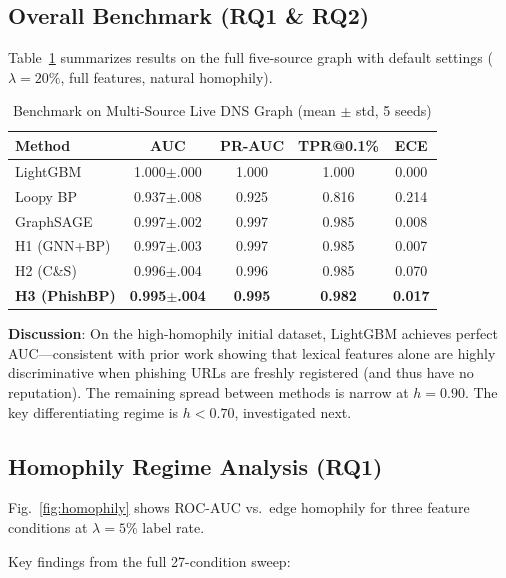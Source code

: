 \documentclass[conference]{IEEEtran}
\begin{document}
\subsection{Overall Benchmark (RQ1 \& RQ2)}

Table~\ref{tab:results} summarizes results on the full five-source graph with
default settings ($\lambda = 20\%$, full features, natural homophily).

\begin{table}[htbp]
\caption{Benchmark on Multi-Source Live DNS Graph (mean $\pm$ std, 5 seeds)}
\label{tab:results}
\begin{center}
\begin{tabular}{lcccc}
\toprule
\textbf{Method} & \textbf{AUC} & \textbf{PR-AUC} & \textbf{TPR@0.1\%} & \textbf{ECE} \\
\midrule
LightGBM        & 1.000$\pm$.000 & 1.000 & 1.000 & 0.000 \\
Loopy BP        & 0.937$\pm$.008 & 0.925 & 0.816 & 0.214 \\
GraphSAGE       & 0.997$\pm$.002 & 0.997 & 0.985 & 0.008 \\
H1 (GNN+BP)     & 0.997$\pm$.003 & 0.997 & 0.985 & 0.007 \\
H2 (C\&S)       & 0.996$\pm$.004 & 0.996 & 0.985 & 0.070 \\
\textbf{H3 (PhishBP)} & \textbf{0.995$\pm$.004} & \textbf{0.995} & \textbf{0.982} & \textbf{0.017} \\
\bottomrule
\end{tabular}
\end{center}
\end{table}

\textbf{Discussion}: On the high-homophily initial dataset, LightGBM achieves
perfect AUC---consistent with prior work showing that lexical features alone
are highly discriminative when phishing URLs are freshly registered (and thus
have no reputation). The remaining spread between methods is narrow at $h =
0.90$. The key differentiating regime is $h < 0.70$, investigated next.

\subsection{Homophily Regime Analysis (RQ1)}

Fig.~\ref{fig:homophily} shows ROC-AUC vs.\ edge homophily for three feature
conditions at $\lambda = 5\%$ label rate.

Key findings from the full 27-condition sweep:
\end{document}
